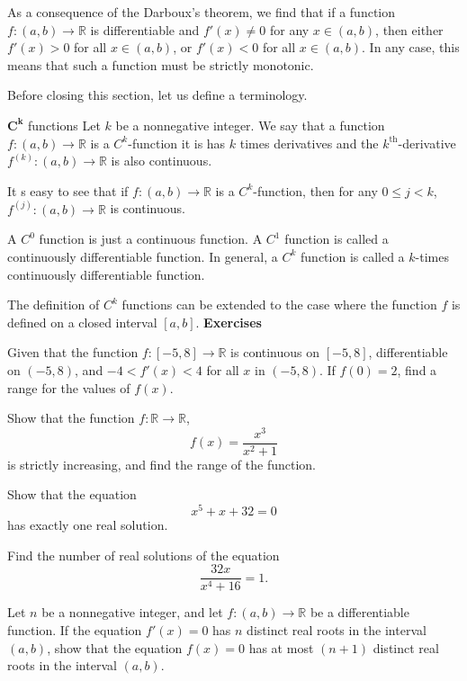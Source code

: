 \begin{remark}[label=remark230216_1]{}
As a consequence of the Darboux's theorem, we find that if a function $f:(a,b)\to\mathbb{R}$ is differentiable and $f'(x)\neq 0$ for any $x\in (a, b)$, then either $f'(x)>0$ for all $x\in (a, b)$, or $f'(x)<0$ for all $x\in (a, b)$. In any case, this means that such  a function must be strictly monotonic. 
\end{remark}

Before closing this section, let us define a terminology.
\begin{definition}{$\pmb{C^k}$ functions}
Let $k$ be a nonnegative integer.
We say that a function $f:(a, b)\to\mathbb{R}$ is a $C^k$-function it is has $k$ times derivatives and the $k^{\text{th}}$-derivative $f^{(k)}:(a,b)\to\mathbb{R}$ is also continuous. 
\end{definition}
It s easy to see that if  $f:(a, b)\to\mathbb{R}$ is a $C^k$-function, then for any $0\leq j<k$, $f^{(j)}:(a,b)\to\mathbb{R}$ is   continuous. 

A $C^0$ function is just a continuous function.
A $C^1$ function is   called a continuously differentiable function.
In general, a $C^k$ function is called a $k$-times continuously differentiable function.

The definition of $C^k$ functions can be extended to the case where the function $f$ is defined on a closed interval $[a, b]$.
\vp
\noindent
{\bf \large Exercises  \thesection}
\setcounter{myquestion}{1}

\begin{question}{\themyquestion}
Given that the function $f:[-5,8]\to\mathbb{R}$ is continuous on $[-5,8]$, differentiable on $(-5,8)$, and $-4<f'(x)<4$ for all $x$ in $ (-5,8)$. If $f(0)=2$, find a range for the values of $f(x)$.
\end{question}

\atc
\begin{question}{\themyquestion}
Show that the function $f:\mathbb{R}\to\mathbb{R}$, 
\[f(x)=\frac{x^3}{x^2+1}\]
is strictly increasing, and find the range of the function.

\end{question}
\atc
\begin{question}{\themyquestion}
Show that the equation
\[ x^5+x+32=0\] has exactly one real solution.
\end{question}
\atc
\begin{question}{\themyquestion}
Find the number of real solutions of the equation
\[ \frac{32x}{x^4+16}=1.\]
\end{question}
\atc
\begin{question}{\themyquestion}
Let $n$ be a nonnegative integer, and let $f:(a, b)\to\mathbb{R}$ be a differentiable function.  If the equation $f'(x)=0$ has   $n$ distinct real roots in the interval $(a,b)$, show that the equation $f(x)=0$ has at most $(n+1)$ distinct real roots in the interval $(a, b)$.
\end{question}
 
